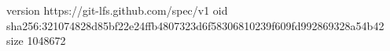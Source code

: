 version https://git-lfs.github.com/spec/v1
oid sha256:321074828d85bf22e24ffb4807323d6f58306810239f609fd992869328a54b42
size 1048672
